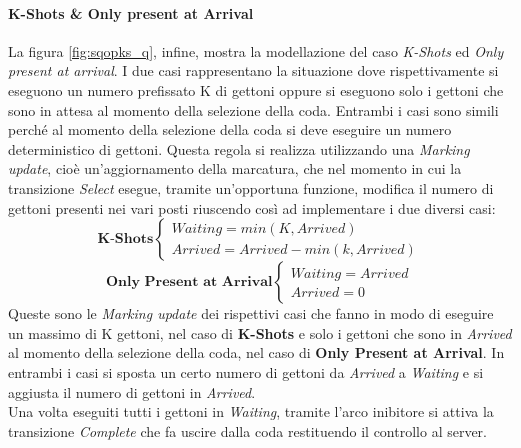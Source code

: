 \documentclass[12pt,a4paper,italian]{article}
\begin{document}
\paragraph{K-Shots \& Only present at Arrival} La figura \ref{fig:sqopks_q}, infine, mostra la modellazione del caso \emph{K-Shots} ed \emph{Only present at arrival}. I due casi rappresentano la situazione dove rispettivamente si eseguono un numero prefissato K di gettoni oppure si eseguono solo i gettoni che sono in attesa al momento della selezione della coda. Entrambi i casi sono simili perché al momento della selezione della coda si deve eseguire un numero deterministico di gettoni. Questa regola si realizza utilizzando una \emph{Marking update}, cioè un'aggiornamento della marcatura, che nel momento in cui la transizione \emph{Select} esegue, tramite un'opportuna funzione, modifica il numero di gettoni presenti nei vari posti riuscendo così ad implementare i due diversi casi:
\begin{equation}
\textbf{K-Shots} \begin{cases}Waiting=min(K,Arrived)\\Arrived=Arrived-min(k,Arrived)\end{cases}
\end{equation}
\begin{equation}
\textbf{Only Present at Arrival}\begin{cases}Waiting=Arrived \\ Arrived=0\end{cases}
\end{equation}
Queste sono le \emph{Marking update} dei rispettivi casi che fanno in modo di eseguire un massimo di K gettoni, nel caso di \textbf{K-Shots} e solo i gettoni che sono in \emph{Arrived} al momento della selezione della coda, nel caso di \textbf{Only Present at Arrival}. In entrambi i casi si sposta un certo numero di gettoni da \emph{Arrived} a \emph{Waiting} e si aggiusta il numero di gettoni in \emph{Arrived}.\\ Una volta eseguiti tutti i gettoni in \emph{Waiting}, tramite l'arco inibitore si attiva la transizione \emph{Complete} che fa uscire dalla coda restituendo il controllo al server.
\end{document}
